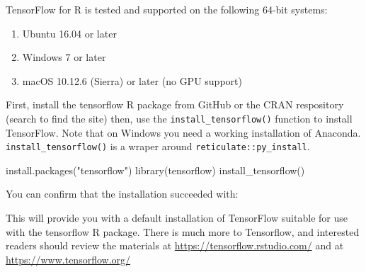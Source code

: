\documentclass[
]{article}
\newenvironment{Shaded}{\begin{snugshade}}{\end{snugshade}}
\newcommand{\DocumentationTok}[1]{\textcolor[rgb]{0.56,0.35,0.01}{\textbf{\textit{#1}}}}
\newcommand{\FunctionTok}[1]{\textcolor[rgb]{0.00,0.00,0.00}{#1}}
\newcommand{\NormalTok}[1]{#1}
\newcommand{\SpecialCharTok}[1]{\textcolor[rgb]{0.00,0.00,0.00}{#1}}
\newcommand{\StringTok}[1]{\textcolor[rgb]{0.31,0.60,0.02}{#1}}
\providecommand{\tightlist}{%
  \setlength{\itemsep}{0pt}\setlength{\parskip}{0pt}}
\begin{document}
TensorFlow for R is tested and supported on the following 64-bit
systems:

\begin{enumerate}
\def\labelenumi{\arabic{enumi}.}
\tightlist
\item
  Ubuntu 16.04 or later
\item
  Windows 7 or later
\item
  macOS 10.12.6 (Sierra) or later (no GPU support)
\end{enumerate}

First, install the tensorflow R package from GitHub or the CRAN
respository (search to find the site) then, use the
\texttt{install\_tensorflow()} function to install TensorFlow. Note that
on Windows you need a working installation of Anaconda.
\texttt{install\_tensorflow()} is a wraper around
\texttt{reticulate::py\_install}.

\begin{Shaded}
\begin{Highlighting}[]
\FunctionTok{install.packages}\NormalTok{(}\StringTok{"tensorflow"}\NormalTok{)}
\FunctionTok{library}\NormalTok{(tensorflow)}
\FunctionTok{install\_tensorflow}\NormalTok{()}
\end{Highlighting}
\end{Shaded}

You can confirm that the installation succeeded with:

\begin{Shaded}
\end{Shaded}

This will provide you with a default installation of TensorFlow suitable
for use with the tensorflow R package. There is much more to Tensorflow,
and interested readers should review the materials at
\url{https://tensorflow.rstudio.com/} and at
\url{https://www.tensorflow.org/}
\end{document}
